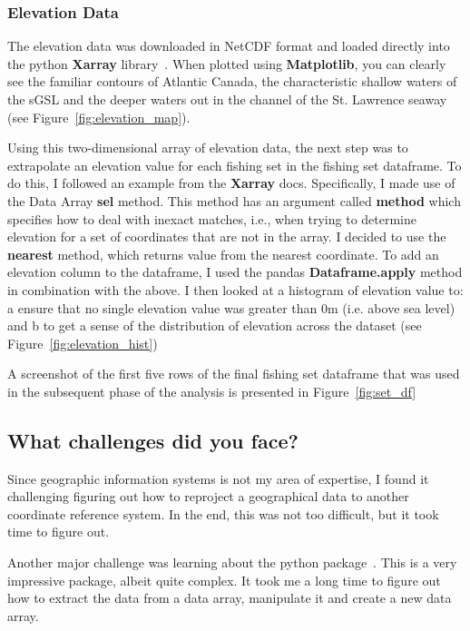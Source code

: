 \subsubsection{Elevation Data}

The elevation data was downloaded in NetCDF format and loaded directly into the python \textbf{Xarray} library~\cite{xarray}.
When plotted using \textbf{Matplotlib}, you can clearly see the familiar contours of Atlantic Canada, the characteristic
shallow waters of the sGSL and the deeper waters out in the channel of the St. Lawrence seaway (see Figure~\ref{fig:elevation_map}).

Using this two-dimensional array of elevation data, the next step was to extrapolate an elevation value for each fishing set in the fishing set dataframe.
To do this, I followed an example from the \textbf{Xarray} docs.
Specifically, I made use of the Data Array \textbf{sel} method.
This method has an argument called \textbf{method} which specifies how to deal with inexact matches, i.e.,
when trying to determine elevation for a set of coordinates that are not in the array. I decided to use the \textbf{nearest} method,
which returns value from the nearest coordinate.
To add an elevation column to the dataframe, I used the pandas \textbf{Dataframe.apply} method in combination with the above.
I then looked at a histogram of elevation value to: a\) ensure that no single elevation value was greater than 0m (i.e. above sea level)
and b\) to get a sense of the distribution of elevation across the dataset (see Figure~\ref{fig:elevation_hist})

A screenshot of the first five rows of the final fishing set dataframe that was used in the subsequent phase of the analysis is presented in
Figure~\ref{fig:set_df}

\subsection{What challenges did you face?}

Since geographic information systems is not my area of expertise, I found it challenging figuring out how to reproject a geographical data to another
coordinate reference system.
In the end, this was not too difficult, but it took time to figure out.

Another major challenge was learning about the  python package~\cite{xarray}.
This is a very impressive package, albeit quite complex.
It took me a long time to figure out how to extract the data from a data array, manipulate it and create a new data array.


